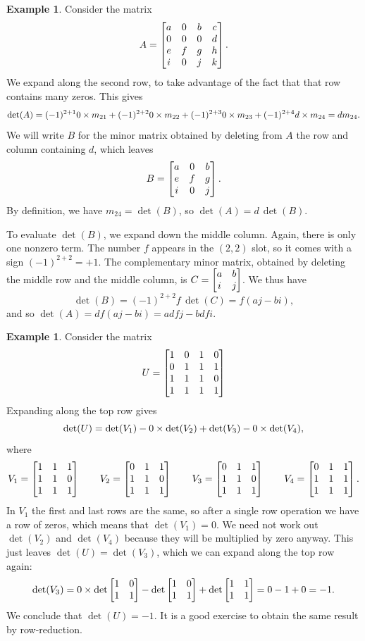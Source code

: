 \documentclass[reqno]{amsart}
\theoremstyle{definition}
\newtheorem{example}[theorem]{Example}
\begin{document}
\begin{example}\label{eg-det-expand-i}
 Consider the matrix
 \[ A =
    \left[\begin{matrix}
     a & 0 & b & c \\
     0 & 0 & 0 & d \\
     e & f & g & h \\
     i & 0 & j & k
    \end{matrix}\right].
 \]
 We expand along the second row, to take advantage of the fact that
 that row contains many zeros.  This gives
 \[ \det(A) = (-1)^{2+1} 0\times m_{21} +
              (-1)^{2+2} 0\times m_{22} +
              (-1)^{2+3} 0\times m_{23} +
              (-1)^{2+4} d\times m_{24}
            = d m_{24}.
 \]
 We will write $B$ for the minor matrix obtained by deleting from $A$
 the row and column containing $d$, which leaves
 \[ B = \left[\begin{matrix} a & 0 & b \\
             e & f & g \\
             i & 0 & j \end{matrix}\right].
 \]
 By definition, we have $m_{24}=\det(B)$, so $\det(A)=d\,\det(B)$.

 To evaluate $\det(B)$, we expand down the middle column.  Again,
 there is only one nonzero term.  The number $f$ appears in the
 $(2,2)$ slot, so it comes with a sign $(-1)^{2+2}=+1$.  The
 complementary minor matrix, obtained by deleting the middle row and
 the middle column, is $C=\left[\begin{matrix} a&b\\ i&j\end{matrix}\right]$.  We thus have
 \[ \det(B) = (-1)^{2+2} f\,\det(C) = f(aj-bi), \]
 and so $\det(A)=df(aj-bi)=adfj-bdfi$.
\end{example}

\begin{example}\label{eg-det-expand-ii}
 Consider the matrix
 \[ U = \left[\begin{matrix}
  1 & 0 & 1 & 0 \\
  0 & 1 & 1 & 1 \\
  1 & 1 & 1 & 0 \\
  1 & 1 & 1 & 1
 \end{matrix}\right] \]
 Expanding along the top row gives
 \[ \det(U) = \det(V_1) - 0\times \det(V_2) + \det(V_3) - 0\times\det(V_4),
 \]
 where
 \[
  V_1 = \left[\begin{matrix} 1&1&1 \\ 1&1&0 \\ 1&1&1 \end{matrix}\right] \qquad
  V_2 = \left[\begin{matrix} 0&1&1 \\ 1&1&0 \\ 1&1&1 \end{matrix}\right] \qquad
  V_3 = \left[\begin{matrix} 0&1&1 \\ 1&1&0 \\ 1&1&1 \end{matrix}\right] \qquad
  V_4 = \left[\begin{matrix} 0&1&1 \\ 1&1&1 \\ 1&1&1 \end{matrix}\right].
 \]
 In $V_1$ the first and last rows are the same, so after a single row
 operation we have a row of zeros, which means that $\det(V_1)=0$.  We
 need not work out $\det(V_2)$ and $\det(V_4)$ because they will be
 multiplied by zero anyway.  This just leaves $\det(U)=\det(V_3)$, which
 we can expand along the top row again:
 \[ \det(V_3) =
     0\times\det\left[\begin{matrix} 1&0 \\ 1&1\end{matrix}\right]
       - \det\left[\begin{matrix} 1&0 \\ 1&1\end{matrix}\right]
       + \det\left[\begin{matrix} 1&1 \\ 1&1\end{matrix}\right]
     = 0-1+0 = -1.
 \]
 We conclude that $\det(U)=-1$.  It is a good exercise to obtain the
 same result by row-reduction.
\end{example}
\end{document}
